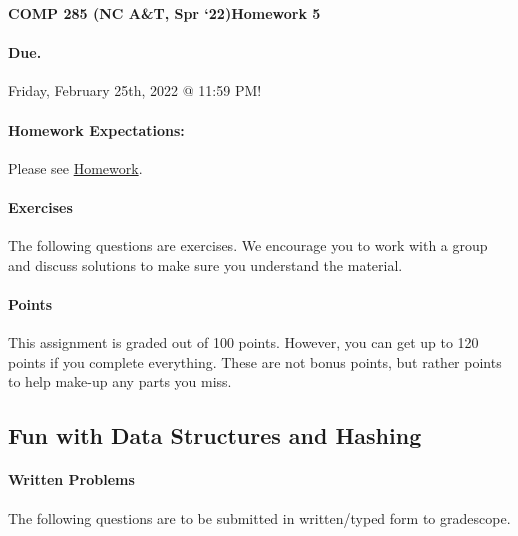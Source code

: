 \documentclass [12pt]{article}
\begin{document}
 

{\LARGE \textbf {COMP 285 (NC A\&T, Spr `22)}\hfill \textbf {Homework 5} } 
\vspace {1em} 
\begin{Instruction} 

\paragraph {Due.} Friday, February 25th, 2022 @ 11:59 PM!
\end{Instruction} 

\vspace {1em} 
\begin{Instruction} \paragraph {Homework Expectations:} Please see \href{https://www.comp285-fall22.ml/homework/#general-homework-information}{Homework}.
\end{Instruction}

\vspace {1em} 
\begin{Instruction} 

\paragraph {Exercises} The following questions are exercises. We encourage you to work with a group and discuss solutions to make sure you understand the material.

\paragraph {Points} This assignment is graded out of 100 points. However, you can get up to 120 points if you complete everything. These are not bonus points, but rather points to help make-up any parts you miss.

\end{Instruction} 

\begin{centering}
\section*{Fun with Data Structures and Hashing}
\end{centering}

\begin{Instruction}

\paragraph{Written Problems} The following questions are to be submitted in written/typed form to gradescope.

\end{Instruction}
\end{document}
